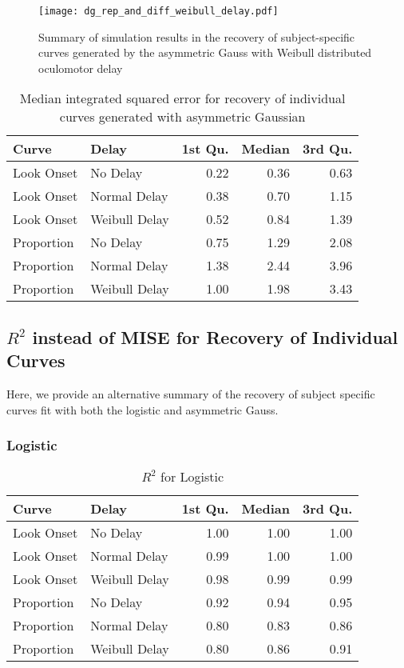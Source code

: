 \begin{figure}[H]
\centering
\texttt{[image: dg\_rep\_and\_diff\_weibull\_delay.pdf]}
\caption{Summary of simulation results in the recovery of subject-specific curves generated by the asymmetric Gauss with Weibull distributed oculomotor delay}
\label{fig:dg_rep_curves_weibull_delay}
\end{figure}




\begin{table}[H]
\centering
\begin{tabular}{llrrr}
  \hline
Curve & Delay & 1st Qu. & Median & 3rd Qu. \\ 
  \hline
Look Onset & No Delay & 0.22 & 0.36 & 0.63 \\ 
  Look Onset & Normal Delay & 0.38 & 0.70 & 1.15 \\ 
  Look Onset & Weibull Delay & 0.52 & 0.84 & 1.39 \\ 
  Proportion & No Delay & 0.75 & 1.29 & 2.08 \\ 
  Proportion & Normal Delay & 1.38 & 2.44 & 3.96 \\ 
  Proportion & Weibull Delay & 1.00 & 1.98 & 3.43 \\ 
   \hline
\end{tabular}
\caption{Median integrated squared error for recovery of individual curves generated with asymmetric Gaussian}
\label{tab:dg_mise_sims}
\end{table}

\subsection{$R^2$ instead of MISE for Recovery of Individual Curves}

Here, we provide an alternative summary of the recovery of subject specific curves fit with both the logistic and asymmetric Gauss. 


\subsubsection{Logistic}

\begin{table}[H]
\centering
\begin{tabular}{llrrr}
  \hline
Curve & Delay & 1st Qu. & Median & 3rd Qu. \\ 
  \hline
Look Onset & No Delay & 1.00 & 1.00 & 1.00 \\ 
  Look Onset & Normal Delay & 0.99 & 1.00 & 1.00 \\ 
  Look Onset & Weibull Delay & 0.98 & 0.99 & 0.99 \\ 
  Proportion & No Delay & 0.92 & 0.94 & 0.95 \\ 
  Proportion & Normal Delay & 0.80 & 0.83 & 0.86 \\ 
  Proportion & Weibull Delay & 0.80 & 0.86 & 0.91 \\ 
   \hline
\end{tabular}
\caption{$R^2$ for Logistic}
\label{tab:r2_logistic_sims}
\end{table}

